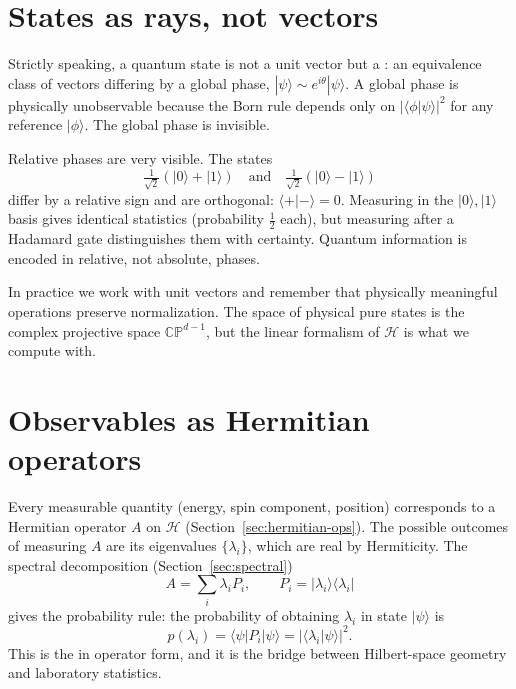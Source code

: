 \section{States as rays, not vectors}

Strictly speaking, a quantum state is not a unit vector but a : an equivalence class of vectors differing by a global phase, $|\psi\rangle \sim e^{i\theta}|\psi\rangle$. A global phase is physically unobservable because the Born rule depends only on $|\langle\phi|\psi\rangle|^2$ for any reference $|\phi\rangle$. The global phase is invisible.

Relative phases are very visible. The states
\[
  \tfrac{1}{\sqrt 2}(|0\rangle + |1\rangle) \quad \text{and} \quad \tfrac{1}{\sqrt 2}(|0\rangle - |1\rangle)
\]
differ by a relative sign and are orthogonal: $\langle +|-\rangle = 0$. Measuring in the $|0\rangle,|1\rangle$ basis gives identical statistics (probability $\tfrac12$ each), but measuring after a Hadamard gate distinguishes them with certainty. Quantum information is encoded in relative, not absolute, phases.

\begin{remark}
In practice we work with unit vectors and remember that physically meaningful operations preserve normalization. The space of physical pure states is the complex projective space $\mathbb{CP}^{d-1}$, but the linear formalism of $\mathcal{H}$ is what we compute with.
\end{remark}

\section{Observables as Hermitian operators}

Every measurable quantity (energy, spin component, position) corresponds to a Hermitian operator $A$ on $\mathcal{H}$ (Section~\ref{sec:hermitian-ops}). The possible outcomes of measuring $A$ are its eigenvalues $\{\lambda_i\}$, which are real by Hermiticity. The spectral decomposition (Section~\ref{sec:spectral})
\[
  A = \sum_i \lambda_i P_i, \qquad P_i = |\lambda_i\rangle\langle\lambda_i|
\]
gives the probability rule: the probability of obtaining $\lambda_i$ in state $|\psi\rangle$ is
\[
  p(\lambda_i) = \langle\psi|P_i|\psi\rangle = |\langle\lambda_i|\psi\rangle|^2.
\]
This is the  \citep{born_zur_1926} in operator form, and it is the bridge between Hilbert-space geometry and laboratory statistics.


